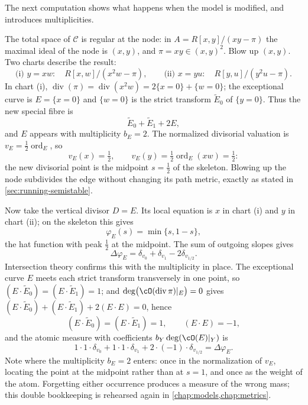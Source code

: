 The next computation shows what happens when the model is modified, and
introduces multiplicities.

\begin{example}
\label{ex:ch01-node-blowup}
The total space of $\mathcal C$ is regular at the node: in
$A=R[x,y]/(xy-\pi)$ the maximal ideal of the node is $(x,y)$, and
$\pi=xy\in(x,y)^2$.  Blow up $(x,y)$.  Two charts describe the result:
\[
 \text{(i) } y=xw:\quad R[x,w]/(x^2w-\pi),
 \qquad
 \text{(ii) } x=yu:\quad R[y,u]/(y^2u-\pi).
\]
In chart (i), $\operatorname{div}(\pi)=\operatorname{div}(x^2w)
=2\{x=0\}+\{w=0\}$; the exceptional curve is $E=\{x=0\}$ and
$\{w=0\}$ is the strict transform $\widetilde E_0$ of $\{y=0\}$.  Thus the
new special fibre is
\[
 \widetilde E_0+\widetilde E_1+2E ,
\]
and $E$ appears with multiplicity $b_E=2$.  The normalized divisorial
valuation is $v_E=\tfrac12\operatorname{ord}_E$, so
\[
 v_E(x)=\tfrac12,\qquad
 v_E(y)=\tfrac12\operatorname{ord}_E(xw)=\tfrac12 :
\]
the new divisorial point is the midpoint $s=\tfrac12$ of the skeleton.
Blowing up the node subdivides the edge without changing its path metric,
exactly as stated in \cref{sec:running-semistable}.

Now take the vertical divisor $D=E$.  Its local equation is $x$ in chart
(i) and $y$ in chart (ii); on the skeleton this gives
\begin{equation}\label{eq:ch01-node-hat}
 \varphi_E(s)=\min\{s,1-s\},
\end{equation}
the hat function with peak $\tfrac12$ at the midpoint.  The sum of outgoing
slopes gives
\[
 \Delta\varphi_E
 =\delta_{v_0}+\delta_{v_1}-2\delta_{v_{1/2}} .
\]
Intersection theory confirms this with the multiplicity in place.  The
exceptional curve $E$ meets each strict transform transversely in one
point, so $(E\cdot\widetilde E_0)=(E\cdot\widetilde E_1)=1$; and
$\deg\bigl(\cO(\operatorname{div}\pi)|_E\bigr)=0$ gives
$(E\cdot\widetilde E_0)+(E\cdot\widetilde E_1)+2(E\cdot E)=0$, hence
\[
 (E\cdot\widetilde E_0)=(E\cdot\widetilde E_1)=1,
 \qquad
 (E\cdot E)=-1,
\]
and the atomic measure with coefficients
$b_Y\deg(\cO(E)|_Y)$ is
\[
 1\cdot1\cdot\delta_{v_0}
 +1\cdot1\cdot\delta_{v_1}
 +2\cdot(-1)\cdot\delta_{v_{1/2}}
 =\Delta\varphi_E .
\]
Note where the multiplicity $b_E=2$ enters: once in the normalization of
$v_E$, locating the point at the midpoint rather than at $s=1$, and once as
the weight of the atom.  Forgetting either occurrence produces a measure of
the wrong mass; this double bookkeeping is rehearsed again in
\cref{chap:models,chap:metrics}.
\end{example}

